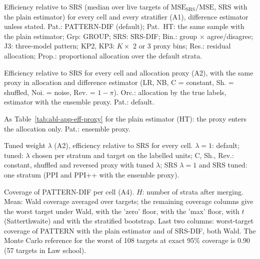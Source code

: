 \begin{table}[!htbp]
\centering\scriptsize
\caption{Efficiency relative to SRS (median over live targets of $\mathrm{MSE}_{\mathrm{SRS}}/\mathrm{MSE}$, SRS with the plain estimator) for every cell and every stratifier (A1), difference estimator unless stated. Pat.: PATTERN-DIF (default); Pat.\ HT: the same sample with the plain estimator; Grp: GROUP; SRS: SRS-DIF; Bin.: group $\times$ agree/disagree; J3: three-model pattern; KP2, KP3: $K\times$ 2 or 3 proxy bins; Res.: residual allocation; Prop.: proportional allocation over the default strata.}
\label{tab:abl-app-eff-design}
\setlength{\tabcolsep}{3pt}

\end{table}

\begin{table}[!htbp]
\centering\scriptsize
\caption{Efficiency relative to SRS for every cell and allocation proxy (A2), with the same proxy in allocation and difference estimator (LR, NB, C = constant, Sh. = shuffled, Noi. = noise, Rev. = $1-\pi$). Orc.: allocation by the true labels, estimator with the ensemble proxy. Pat.: default.}
\label{tab:abl-app-eff-proxy}
\setlength{\tabcolsep}{4pt}

\end{table}

\begin{table}[!htbp]
\centering\scriptsize
\caption{As Table~\ref{tab:abl-app-eff-proxy} for the plain estimator (HT): the proxy enters the allocation only. Pat.: ensemble proxy.}
\label{tab:abl-app-eff-proxy-ht}
\setlength{\tabcolsep}{4pt}

\end{table}

\begin{table}[!htbp]
\centering\scriptsize
\caption{Tuned weight $\lambda$ (A2), efficiency relative to SRS for every cell. $\lambda=1$: default; tuned: $\lambda$ chosen per stratum and target on the labelled units; C, Sh., Rev.: constant, shuffled and reversed proxy with tuned $\lambda$; SRS $\lambda{=}1$ and SRS tuned: one stratum (PPI and PPI++ with the ensemble proxy).}
\label{tab:abl-app-eff-tuned}
\setlength{\tabcolsep}{4pt}

\end{table}

\begin{table}[!htbp]
\centering\scriptsize
\caption{Coverage of PATTERN-DIF per cell (A4). $H$: number of strata after merging. Mean: Wald coverage averaged over targets; the remaining coverage columns give the worst target under Wald, with the 'zero' floor, with the 'max' floor, with $t$ (Satterthwaite) and with the stratified bootstrap. Last two columns: worst-target coverage of PATTERN with the plain estimator and of SRS-DIF, both Wald. The Monte Carlo reference for the worst of 108 targets at exact 95\% coverage is 0.90 (57 targets in Law school).}
\label{tab:abl-app-cov}
\setlength{\tabcolsep}{4pt}

\end{table}

